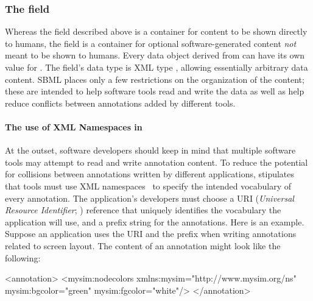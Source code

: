 \subsubsection{The  field}
\label{sec:annotation-use}

Whereas the  field described above is a container for
content to be shown directly to humans, the 
field is a container for optional software-generated content
\emph{not} meant to be shown to humans.  Every data object derived
from \SBase can have its own value for .  The
field's data type is XML type , allowing essentially
arbitrary data content.  SBML places only a few restrictions on
the organization of the content; these are intended to help
software tools read and write the data as well as help reduce
conflicts between annotations added by different tools.


\paragraph{The use of XML Namespaces in }


At the outset, software developers should keep in mind that
multiple software tools may attempt to read and write annotation
content.  To reduce the potential for collisions between
annotations written by different applications, \sbmltwotwo
stipulates that tools must use XML namespaces~\citep{bray:1999} to
specify the intended vocabulary of every annotation.  The
application's developers must choose a URI (\emph{Universal
  Resource Identifier}; \citealt{harold:2001,w3c:2000}) reference
that uniquely identifies the vocabulary the application will use,
and a prefix string for the annotations.  Here is an example.
Suppose an application uses the URI 
and the prefix  when writing annotations related to
screen layout.  The content of an annotation might look like the
following:

\begin{example}
<annotation>
    <mysim:nodecolors xmlns:mysim="http://www.mysim.org/ns"
         mysim:bgcolor="green" mysim:fgcolor="white"/>
</annotation>
\end{example}


